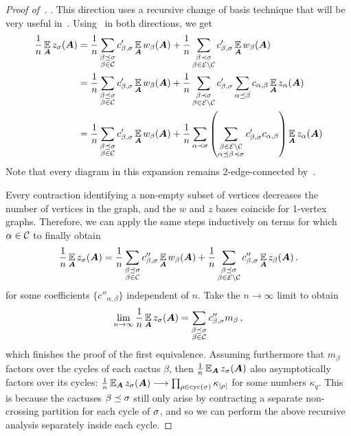 \begin{proof}[Proof of~]
    . This direction uses a recursive change of basis technique that will be very useful in~.
    Using~ in both directions, we get
    \begin{align*}
        \frac 1n \operatorname*{\mathbb{E}}_{{\bm A}} z_\sigma({\bm A}) &= \frac 1n \sum_{\substack{\beta\preceq \sigma\\\beta\in{\cal C}}} c'_{\beta,\sigma} \operatorname*{\mathbb{E}}_{{\bm A}} w_\beta({\bm A}) + \frac 1n \sum_{\substack{\beta\prec \sigma\\\beta\in{\cal E}\setminus{\cal C}}} c'_{\beta,\sigma} \operatorname*{\mathbb{E}}_{{\bm A}} w_\beta({\bm A})\\
        &= \frac 1n \sum_{\substack{\beta\preceq \sigma\\\beta\in{\cal C}}} c'_{\beta,\sigma} \operatorname*{\mathbb{E}}_{{\bm A}} w_\beta({\bm A}) + \frac 1n \sum_{\substack{\beta\prec \sigma\\\beta\in{\cal E}\setminus{\cal C}}} c'_{\beta,\sigma} 
        \sum_{\alpha\preceq \beta} c_{\alpha,\beta} \operatorname*{\mathbb{E}}_{{\bm A}} z_\alpha({\bm A})\\
        &= \frac 1n \sum_{\substack{\beta\preceq \sigma\\\beta\in{\cal C}}} c'_{\beta,\sigma} \operatorname*{\mathbb{E}}_{{\bm A}} w_\beta({\bm A}) +  \frac 1n  \sum_{\alpha\prec \sigma}\left(\sum_{\substack{\beta\in{\cal E}\setminus{\cal C}\\ \alpha \preceq \beta \prec \sigma}} c'_{\beta,\sigma} c_{\alpha,\beta}\right) \operatorname*{\mathbb{E}}_{{\bm A}} z_\alpha({\bm A})
    \end{align*}
    Note that every diagram in this expansion
    remains 2-edge-connected by~.
    
    Every contraction identifying
    a non-empty subset of vertices decreases
    the number of vertices in the graph, and
     the $w$ and $z$ bases coincide for 1-vertex
    graphs. Therefore, we can
    apply the same steps inductively on terms
    for which $\alpha\in{\cal C}$ to finally obtain
    \[
        \frac 1n \operatorname*{\mathbb{E}}_{{\bm A}} z_\sigma({\bm A}) = \frac 1n \sum_{\substack{\beta\preceq \sigma\\\beta\in {\cal C}}} c''_{\beta,\sigma} \operatorname*{\mathbb{E}}_{{\bm A}} w_\beta({\bm A}) + \frac 1n \sum_{\substack{\beta\preceq \sigma\\\beta\in {\cal E}\setminus {\cal C}}} c''_{\beta,\sigma} \operatorname*{\mathbb{E}}_{{\bm A}} z_\beta({\bm A})\,.
    \]
    for some coefficients $\{c''_{\alpha,\beta}\}$ independent of $n$.
    Take the $n\to\infty$ limit
    to obtain
    \[
        \lim_{n\to\infty} \frac 1n \operatorname*{\mathbb{E}}_{{\bm A}} z_\sigma({\bm A}) = \sum_{\substack{\beta\preceq \sigma\\\beta\in {\cal C}}} c''_{\beta,\sigma} m_\beta\,,
    \]
    which finishes the proof of the first equivalence.
    Assuming furthermore that $m_\beta$ factors over the cycles of each cactus $\beta$,
    then $\frac 1n \operatorname*{\mathbb{E}}_{\bm A} z_\sigma({\bm A})$
    also asymptotically factors over its cycles: $\frac 1n \operatorname*{\mathbb{E}}_{\bm A} z_\sigma({\bm A}) \longrightarrow \prod_{\rho \in \mathrm{cyc}(\sigma)} \kappa_{|\rho|}$ for some numbers $\kappa_q$.
    This is because the cactuses $\beta \preceq \sigma$ still only arise by contracting a separate non-crossing partition for each cycle of $\sigma$, and so we can perform the above recursive analysis separately inside each cycle.
\end{proof}

